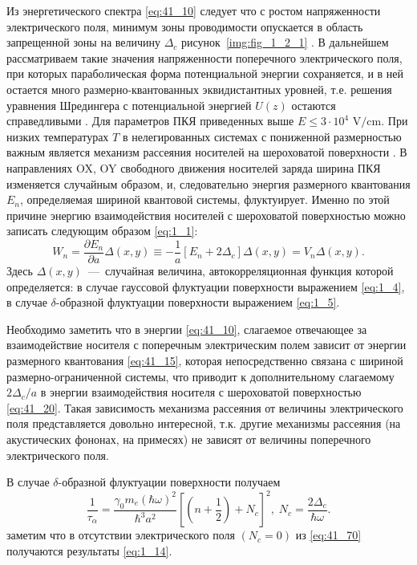 Из энергетического спектра \eqref{eq:41_10} следует что с ростом напряженности электрического поля, минимум зоны проводимости опускается в область запрещенной зоны на величину $\Delta _{c} $ рисунок~\ref{img:fig_1_2_1} . В дальнейшем рассматриваем такие значения напряженности поперечного электрического поля, при которых параболическая форма потенциальной энергии сохраняется, и в ней остается много размерно-квантованных эквидистантных уровней, т.е. решения уравнения Шредингера с потенциальной энергией $U(z)$ остаются справедливыми \cite{Kanarovskii1995}. Для параметров ПКЯ приведенных выше $E\le 3\cdot 10^4\text{ V/cm}$. При низких температурах $T$ в нелегированных системах с пониженной размерностью важным является механизм рассеяния носителей на шероховатой поверхности \cite{Sakaki1987,Vurgaftman1999}. В направлениях OX, OY свободного движения носителей заряда ширина ПКЯ изменяется случайным образом, и, следовательно энергия размерного квантования $E_n$, определяемая шириной квантовой системы, флуктуирует. Именно по этой причине энергию взаимодействия носителей с шероховатой поверхностью можно записать следующим образом \eqref{eq:1_1}:
\begin{equation} \label{eq:41_20}
W_{n} =\frac{\partial E_n }{\partial a} \Delta(x,y) \equiv -\frac{1}{a} \left[ E_n +2\Delta_c \right] \Delta (x,y)=V_n \Delta (x,y).
\end{equation}
Здесь $\Delta (x,y)$~---~случайная величина, автокорреляционная функция которой определяется: в случае гауссовой флуктуации поверхности выражением \eqref{eq:1_4}, в случае $\delta$-образной флуктуации поверхности выражением \eqref{eq:1_5}.

Необходимо заметить что в энергии \eqref{eq:41_10}, слагаемое отвечающее за взаимодействие носителя с поперечным электрическим полем зависит от энергии размерного квантования \eqref{eq:41_15}, которая непосредственно связана с шириной размерно-ограниченной системы, что приводит к дополнительному слагаемому $2\Delta_c / a$ в энергии взаимодействия носителя с шероховатой поверхностью \eqref{eq:41_20}. Такая зависимость механизма рассеяния от величины электрического поля представляется довольно интересной, т.к. другие механизмы рассеяния (на акустических фононах, на примесях) не зависят от величины поперечного электрического поля.

В случае $\delta $-образной флуктуации поверхности получаем
\begin{equation} \label{eq:41_70}
\frac{1}{\tau _{\alpha } } =\frac{\gamma_0 m_e (\hbar\omega)^2 }{\hbar^3 a^2 } \left[\left(n+\frac{1}{2} \right)+N_c \right]^2, \;
N_c =\frac{2\Delta_c }{\hbar \omega } .
\end{equation}  
заметим что в отсутствии электрического поля $(N_c = 0)$ из \eqref{eq:41_70} получаются результаты \eqref{eq:1_14}.

